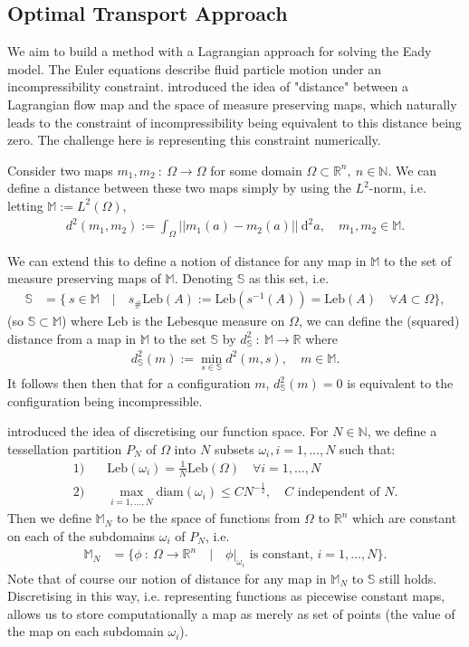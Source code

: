 \documentclass[11pt, oneside]{article}   	%
\newcommand{\R}{\mathbb{R}}
\newcommand{\MN}{\mathbb{M}_N}
\newcommand{\dsmsq}{d^{2}_{\mathbb{S}}(m)}
\newcommand{\M}{\mathbb{M}}
\newcommand{\N}{\mathbb{N}}
\newcommand{\Sb}{\mathbb{S}}
\newcommand{\Leb}{\mathrm{Leb}}
\begin{document}
\subsection{Optimal Transport Approach}

We aim to build a method with a Lagrangian approach for solving the Eady model. The Euler equations describe fluid particle motion under an incompressibility constraint. \cite{brenier1989least} introduced the idea of "distance" between a Lagrangian flow map and the space of measure preserving maps, which naturally leads to the constraint of incompressibility being equivalent to this distance being zero. The challenge here is representing this constraint numerically.

Consider two maps \(m_1, m_2 \: : \: \Omega \to \Omega\) for some domain \(\Omega \subset \R^n, \: n \in \N\). We can define a distance between these two maps simply by using the \(L^2\)-norm, i.e. letting \(\M := L^2(\Omega)\), 
\begin{align}
d^2(m_1, m_2) := \int_\Omega || m_1(a) - m_2(a) || \: \mathrm{d}^2 a, \quad m_1, m_2 \in \M.
\end{align}

We can extend this to define a notion of distance for any map in \(\M\) to the set of measure preserving maps of \(\M\). Denoting \(\Sb\) as this set, i.e. 
\begin{align}
\Sb &= \{ \: s \in \M \quad | \quad s_{\#}\Leb(A) := \Leb(s^{-1}(A)) = \Leb(A) \quad \forall A \subset \Omega \},
\end{align}
(so \(\Sb \subset \M\)) where \(\Leb\) is the Lebesque measure on \(\Omega\), we can define the (squared) distance from a map in \(\M\) to the set \(\Sb\) by \(d^2_\Sb \: : \: \M \to \R\) where
\begin{align}
\dsmsq := \min_{s \in \mathbb{S}} d^2(m, s), \quad m \in \M.
\end{align}
It follows then then that for a configuration \(m\), \(\dsmsq = 0\) is equivalent to the configuration being incompressible.

\cite{gallouet2016lagrangian} introduced the idea of discretising our function space. For \(N \in \N\), we define a tessellation partition \(P_N\) of \(\Omega\) into \(N\) subsets \(\omega_i, i=1,\dots,N\) such that:
\begin{align}
1)& \quad \Leb(\omega_i) = \frac{1}{N}\Leb(\Omega) \quad \forall i = 1,\dots,N \\
2)& \quad \max_{i = 1,\dots,N} \mathrm{diam}(\omega_i) \le CN^{-\frac{1}{2}}, \quad C \text{ independent of } N.
\end{align}
Then we define \(\MN\) to be the space of functions from \(\Omega\) to \(\R^n\) which are constant on each of the subdomains \(\omega_i\) of \(P_N\), i.e.
\begin{align}
\MN &= \{ \phi \: : \: \Omega \to \R^n \quad | \quad \phi | _{\omega_i} \text{ is constant, } i = 1,\dots,N\}.
\end{align}
Note that of course our notion of distance for any map in \(\MN\) to \(\Sb\) still holds. Discretising in this way, i.e. representing functions as piecewise constant maps, allows us to store computationally a map as merely as set of points (the value of the map on each subdomain \(\omega_i\)).
\end{document}
